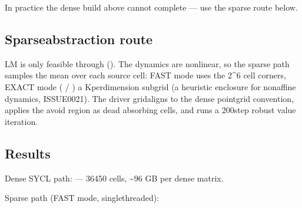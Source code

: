 \documentclass[a4paper,10pt,english]{sphinxmanual}
\begin{document}
\sphinxAtStartPar
In practice the dense build above cannot complete — use the sparse route below.


\subsection{Sparse\sphinxhyphen{}abstraction route}
\label{\detokenize{benchmarks/LM:sparse-abstraction-route}}
\sphinxAtStartPar
LM is only feasible through  (). The dynamics
are nonlinear, so the sparse path samples the mean over each source cell: FAST mode
uses the 2\textasciicircum{}6 cell corners, EXACT mode ( / ) a K\sphinxhyphen{}per\sphinxhyphen{}dimension
sub\sphinxhyphen{}grid (a heuristic enclosure for non\sphinxhyphen{}affine dynamics, ISSUE\sphinxhyphen{}0021). The driver
grid\sphinxhyphen{}aligns to the dense point\sphinxhyphen{}grid convention, applies the avoid region as dead
absorbing cells, and runs a 200\sphinxhyphen{}step robust value iteration.


\subsection{Results}
\label{\detokenize{benchmarks/LM:results}}
\sphinxAtStartPar
Dense SYCL path:  — 36450 cells, \textasciitilde{}96 GB per dense matrix.

\sphinxAtStartPar
Sparse path (FAST mode, single\sphinxhyphen{}threaded):
\end{document}
